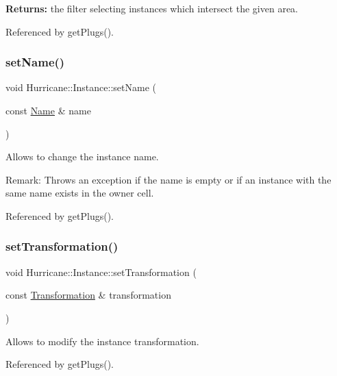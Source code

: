 {\bfseries Returns\+:} the filter selecting instances which intersect the given area. 

Referenced by get\+Plugs().

\mbox{\label{classHurricane_1_1Instance_ae3b67792d1659f1a20c6533b8843b905}} 
\subsubsection{\texorpdfstring{set\+Name()}{setName()}}
{\footnotesize\ttfamily void Hurricane\+::\+Instance\+::set\+Name (\begin{DoxyParamCaption}\item[{const \hyperlink{classHurricane_1_1Name}{Name} \&}]{name }\end{DoxyParamCaption})}

Allows to change the instance name.

\begin{DoxyParagraph}{Remark\+:}
Throws an exception if the name is empty or if an instance with the same name exists in the owner cell. 
\end{DoxyParagraph}


Referenced by get\+Plugs().

\mbox{\label{classHurricane_1_1Instance_a8890d2e1b2ba2542997454297e63512f}} 
\subsubsection{\texorpdfstring{set\+Transformation()}{setTransformation()}}
{\footnotesize\ttfamily void Hurricane\+::\+Instance\+::set\+Transformation (\begin{DoxyParamCaption}\item[{const \hyperlink{classHurricane_1_1Transformation}{Transformation} \&}]{transformation }\end{DoxyParamCaption})}

Allows to modify the instance transformation. 

Referenced by get\+Plugs().

